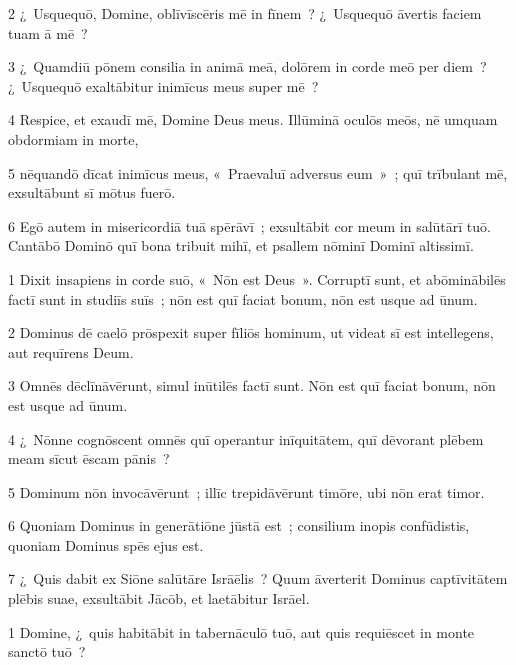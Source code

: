 \psalmVerse
  {\phantom{00}2}
  {¿~Usquequō, Domine, oblīvīscēris mē in fīnem~? ¿~Usquequō āvertis faciem tuam ā mē~?}


\psalmVerse
  {\phantom{00}3}
  {¿~Quamdiū pōnem consilia in animā meā, dolōrem in corde meō per diem~? ¿~Usquequō exaltābitur inimīcus meus super mē~?}


\psalmVerse
  {\phantom{00}4}
  {Respice, et exaudī mē, Domine Deus meus. Illūminā oculōs meōs, nē umquam obdormiam in morte,}


\psalmVerse
  {\phantom{00}5}
  {nēquandō dīcat inimīcus meus, «~Praevaluī adversus eum~»~; quī trībulant mē, exsultābunt sī mōtus fuerō.}


\psalmVerse
  {\phantom{00}6}
  {Egō autem in misericordiā tuā spērāvī~; exsultābit cor meum in salūtārī tuō. Cantābō Dominō quī bona tribuit mihī, et psallem nōminī Dominī altissimī.}



\psalmVerse
  {\phantom{00}1}
  {Dixit insapiens in corde suō, «~Nōn est Deus~». Corruptī sunt, et abōminābilēs factī sunt in studiīs suīs~; nōn est quī faciat bonum, nōn est usque ad ūnum.}


\psalmVerse
  {\phantom{00}2}
  {Dominus dē caelō prōspexit super fīliōs hominum, ut videat sī est intellegens, aut requīrens Deum.}


\psalmVerse
  {\phantom{00}3}
  {Omnēs dēclīnāvērunt, simul inūtilēs factī sunt. Nōn est quī faciat bonum, nōn est usque ad ūnum.}


\psalmVerse
  {\phantom{00}4}
  {¿~Nōnne cognōscent omnēs quī operantur inīquitātem, quī dēvorant plēbem meam sīcut ēscam pānis~?}


\psalmVerse
  {\phantom{00}5}
  {Dominum nōn invocāvērunt~; illīc trepidāvērunt timōre, ubi nōn erat timor.}


\psalmVerse
  {\phantom{00}6}
  {Quoniam Dominus in generātiōne jūstā est~; consilium inopis confūdistis, quoniam Dominus spēs ejus est.}


\psalmVerse
  {\phantom{00}7}
  {¿~Quis dabit ex Siōne salūtāre Isrāēlis~? Quum āverterit Dominus captīvitātem plēbis suae, exsultābit Jācōb, et laetābitur Isrāel.}




\psalmVerse
  {\phantom{00}1}
  {Domine, ¿~quis habitābit in tabernāculō tuō, aut quis requiēscet in monte sanctō tuō~?}


